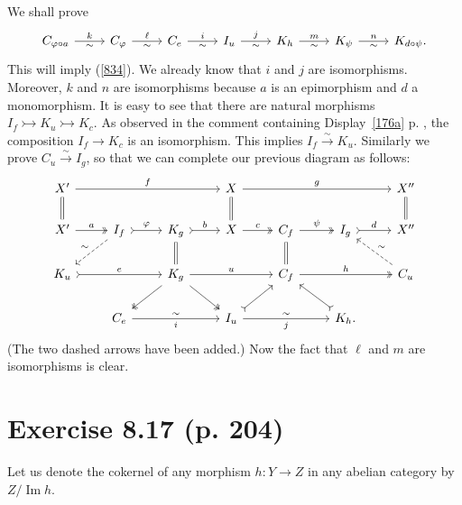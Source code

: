 \documentclass[12pt]{article}
\theoremstyle{remark}
\newcommand{\mono}{\rightarrowtail}
\newcommand{\p}{\varphi}
\newcommand{\xr}{\xrightarrow}
\newcommand{\ccd}{the comment containing Display}
\DeclareMathOperator{\Ima}{Im}
\begin{document}
We shall prove 
$$
\begin{tikzcd}
C_{\p\circ a}\ar{r}{k}[swap]{\sim}&C_\p\ar{r}{\ell}[swap]{\sim}&C_e\ar{r}{i}[swap]{\sim}&I_u\ar{r}{j}[swap]{\sim}&K_h\ar{r}{m}[swap]{\sim}&K_\psi\ar{r}{n}[swap]{\sim}&K_{d\circ\psi}.
\end{tikzcd}
$$
This will imply (\ref{834}). We already know that $i$ and $j$ are isomorphisms. Moreover, $k$ and $n$ are isomorphisms because $a$ is an epimorphism and $d$ a monomorphism. It is easy to see that there are natural morphisms $I_f\mono K_u\mono K_c$. As observed in \ccd\ \eqref{176a} p. \pageref{176a}, the composition $I_f\to K_c$ is an isomorphism. This implies $I_f\xr\sim K_u$. Similarly we prove $C_u\xr\sim I_g$, so that we can complete our previous diagram as follows: 
$$
\begin{tikzcd}
X'\ar{rrr}{f}\ar[equal]{d}&&&X\ar[equal]{d}\ar{rrr}{g}&&&X''\ar[equal]{d}\\ 
X'\ar[two heads]{r}{a}&I_f\ar[dashed]{dl}[swap]{\sim}\ar[tail]{r}{\p}&K_g\ar[equal]{d}\ar[tail]{r}{b}&X\ar[two heads]{r}{c}&C_f\ar[equal]{d}\ar[two heads]{r}{\psi}&I_g\ar[tail]{r}{d}&X''\\ 
K_u\ar[tail]{rr}{e}&&K_g\ar[two heads]{dl}\ar[two heads]{dr}\ar{rr}{u}&&C_f\ar[two heads]{rr}{h}&&C_u\ar[dashed]{ul}[swap]{\sim}\\ 
&C_e\ar{rr}{\sim}[swap]{i}&&I_u\ar[tail]{ur}\ar{rr}{\sim}[swap]{j}&&K_h.\ar[tail]{ul}
\end{tikzcd}
$$ 
(The two dashed arrows have been added.) Now the fact that $\ell$ and $m$ are isomorphisms is clear. 
%
\section{Exercise 8.17 (p. 204)}\label{817} 
%
Let us denote the cokernel of any morphism $h:Y\to Z$ in any abelian category by $Z/\Ima h$. 
\end{document}
